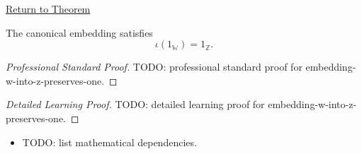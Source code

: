 \newpage
{}
\label{prf:embedding-w-into-z-preserves-one}

\begin{remark*}[Return]
\hyperref[thm:embedding-w-into-z-preserves-one]{Return to Theorem}
\end{remark*}

\begin{theorem*}
The canonical embedding satisfies
\[
\iota(1_{\mathbb{W}})=1_{\mathbb{Z}}.
\]
\end{theorem*}

\begin{proof}[Professional Standard Proof]
\LRAProofBodyStart
TODO: professional standard proof for embedding-w-into-z-preserves-one.
\end{proof}

\begin{proof}[Detailed Learning Proof]
\LRAProofBodyStart
TODO: detailed learning proof for embedding-w-into-z-preserves-one.
\end{proof}

\begin{remark*}
\end{remark*}

\begin{dependencies}
\begin{itemize}
  \item TODO: list mathematical dependencies.
\end{itemize}
\end{dependencies}

\clearpage
